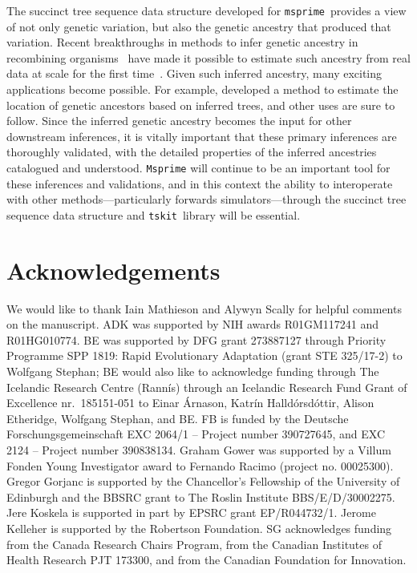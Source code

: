 \documentclass{article}
\newcommand{\msprime}[0]{\texttt{msprime}}
\newcommand{\tskit}[0]{\texttt{tskit}}
\begin{document}
The succinct tree sequence data structure developed
for \msprime\ provides a view of not only
genetic variation, but also the genetic ancestry that produced that variation.
Recent breakthroughs in methods to infer genetic ancestry in recombining
organisms~\citep{rasmussen2014genome,kelleher2019inferring,
speidel2019method,wohns2021unified,schaefer2021ancestral,speidel2021inferring}
have made it possible to estimate such ancestry from real data at scale for
the first time~\citep{harris2019database,tang2019genealogy}.
Given such inferred ancestry, many exciting applications
become possible. For example, \cite{osmond2021estimating}
developed a method to estimate the location of genetic ancestors
based on inferred trees, and other uses are sure to follow.
Since the inferred genetic ancestry
becomes the input for other downstream inferences, it is vitally
important that these primary inferences are thoroughly validated,
with the detailed properties of the inferred ancestries
catalogued and understood.
\texttt{Msprime} will continue to be an important tool for these inferences and validations,
and in this context the ability to interoperate
with other methods---particularly forwards simulators---through
the succinct tree sequence data structure and \tskit\ library
will be essential.

\section*{Acknowledgements}
We would like to thank Iain Mathieson and Alywyn Scally for helpful comments
on the manuscript.
ADK was supported by NIH awards R01GM117241 and R01HG010774.
BE was supported by  DFG grant  273887127 through Priority Programme SPP 1819: Rapid Evolutionary Adaptation (grant STE 325/17-2) to Wolfgang Stephan; BE would also like to acknowledge  funding through The Icelandic Research Centre (Rann{\'i}s) through an Icelandic Research Fund Grant of  Excellence nr.\ 185151-051 to Einar \'Arnason,  Katr\'in Halld\'orsd\'ottir,  Alison Etheridge,  Wolfgang Stephan, and BE.
FB is funded by the Deutsche Forschungsgemeinschaft EXC 2064/1 -- Project number 390727645, and EXC 2124 -- Project number 390838134.
Graham Gower was supported by a Villum Fonden Young Investigator award to Fernando Racimo (project no. 00025300).
Gregor Gorjanc is supported by the Chancellor's Fellowship of the University of Edinburgh and the BBSRC grant to The Roslin Institute BBS/E/D/30002275.
Jere Koskela is supported in part by EPSRC grant EP/R044732/1.
Jerome Kelleher is supported by the Robertson Foundation.
SG acknowledges funding from the Canada Research Chairs Program, from the Canadian Institutes of Health Research PJT 173300, and from the Canadian Foundation for Innovation.
\end{document}
